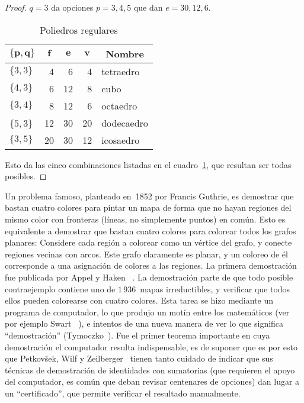 \begin{proof}
    \(q = 3\) da opciones \(p = 3, 4, 5\)
    que dan \(e = 30, 12, 6\).
    \begin{table}[htbp]
      \centering
      \begin{tabular}{|l|r|r|r|l|}
	\hline
	\multicolumn{1}{|c|}{\rule[-0.7ex]{0pt}{3ex}%
				\(\boldsymbol{\{p, q\}}\)} &
	  \multicolumn{1}{c|}{\(\boldsymbol{f}\)} &
	  \multicolumn{1}{c|}{\(\boldsymbol{e}\)} &
	  \multicolumn{1}{c|}{\(\boldsymbol{v}\)} &
	  \multicolumn{1}{c|}{\textbf{Nombre}} \\
	\hline
	\(\{3, 3\}\) &	4 &  6 &  4 & tetraedro	 \\
	\(\{4, 3\}\) &	6 & 12 &  8 & cubo	 \\
	\(\{3, 4\}\) &	8 & 12 &  6 & octaedro	 \\
	\(\{5, 3\)\} & 12 & 30 & 20 & dodecaedro \\
	\(\{3, 5\}\) & 20 & 30 & 12 & icosaedro	 \\
	\hline
      \end{tabular}
      \caption{Poliedros regulares}
      \label{tab:poliedros}
    \end{table}
    Esto da las cinco combinaciones
    listadas en el cuadro~\ref{tab:poliedros},
    que resultan ser todas posibles.
  \end{proof}

  Un problema famoso,
  planteado en~1852 por Francis Guthrie,
  es demostrar que bastan cuatro colores para pintar un mapa
  de forma que no hayan regiones del mismo color con fronteras
  (líneas, no simplemente puntos)
  en común.%
  Esto es equivalente a demostrar
  que bastan cuatro colores para colorear todos los grafos planares:
  Considere cada región a colorear como un vértice del grafo,
  y conecte regiones vecinas con arcos.
  Este grafo claramente es planar,
  y un coloreo de él
  corresponde a una asignación de colores a las regiones.
  La primera demostración fue publicada por Appel y Haken~%
    \cite{appel77:_four_color_theorem_1,
	  appel77:_four_color_theorem_2}.
  La demostración parte de que todo posible contraejemplo
  contiene uno de \(1\,936\)~mapas irreductibles,
  y verificar que todos ellos pueden colorearse con cuatro colores.
  Esta tarea se hizo mediante un programa de computador,
  lo que produjo un motín entre los matemáticos
  (ver por ejemplo Swart~%
     \cite{swart80:_philos_impl_four_color_problem}),
  e intentos de una nueva manera de ver
  lo que significa ``demostración''
  (Tymoczko~\cite{tymoczko80:_comput_proof_mathem}).
  Fue el primer teorema importante
  en cuya demostración el computador resulta indispensable,
  es de suponer que es por esto que Petkovšek, Wilf y Zeilberger~%
    \cite{petkovsek96:_AeqB}
  tienen tanto cuidado de indicar
  que sus técnicas de demostración de identidades con sumatorias
  (que requieren el apoyo del computador,
   es común que deban revisar centenares de opciones)
  dan lugar a un ``certificado'',
  que permite verificar el resultado manualmente.


